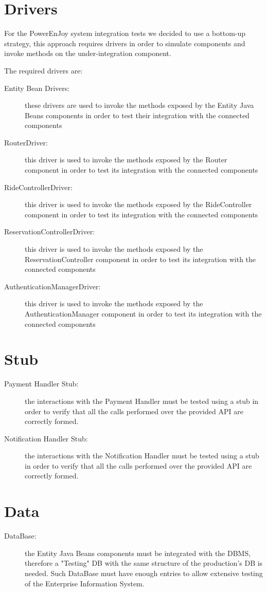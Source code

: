 \section{Drivers}
For the PowerEnJoy system integration tests we decided to use a bottom-up strategy, this approach requires drivers in order to simulate components and invoke methods on the under-integration component.

The required drivers are:
\begin{description}
	\item [Entity Bean Drivers: ] these drivers are used to invoke the methods exposed by the Entity Java Beans components in order to test their integration with the connected components
	\item [RouterDriver: ] this driver is used to invoke the methods exposed by the Router component in order to test its integration with the connected components
	\item [RideControllerDriver: ] this driver is used to invoke the methods exposed by the RideController component in order to test its integration with the connected components
	\item [ReservationControllerDriver: ] this driver is used to invoke the methods exposed by the ReservationController component in order to test its integration with the connected components
	\item [AuthenticationManagerDriver: ] this driver is used to invoke the methods exposed by the AuthenticationManager component in order to test its integration with the connected components
\end{description}

\section{Stub}
\begin{description}
	\item [Payment Handler Stub: ] the interactions with the Payment Handler must be tested using a stub in order to verify that all the calls performed over the provided API are correctly formed.
	\item [Notification Handler Stub: ] the interactions with the Notification Handler must be tested using a stub in order to verify that all the calls performed over the provided API are correctly formed.
\end{description}

\section{Data}
\begin{description}
	\item [DataBase: ] the Entity Java Beans components must be integrated with the DBMS, therefore a "Testing" DB with the same structure of the production's DB is needed. Such DataBase must have enough entries to allow extensive testing of the Enterprise Information System.
\end{description}
